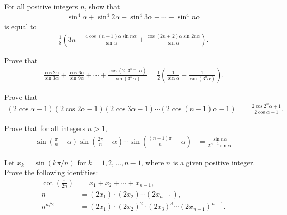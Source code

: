 \begin{question}
    For all positive integers $n$, show that
    \begin{align*}
        \sin^4 \alpha + \sin^4 2\alpha + \sin^4 3\alpha + \cdots + \sin^4 n\alpha
    \end{align*}
    is equal to
    \begin{align*}
        \frac{1}{8}\left(3n - \frac{4\cos(n+1)\alpha \sin n\alpha }{\sin \alpha} + \frac{\cos(2n+2)\alpha \sin 2n\alpha}{\sin \alpha}\right).
    \end{align*}
\end{question}

\begin{question}
    Prove that
    \begin{align*}
        \frac{\cos 2\alpha}{\sin 3\alpha} + \frac{\cos 6\alpha}{\sin 9\alpha} + \cdots + \frac{\displaystyle\cos\left(2\cdot 3^{n-1}\alpha\right)}{\displaystyle\sin\left(3^n\alpha\right)} = \frac{1}{2}\left(\frac{1}{\sin \alpha} - \frac{1}{\sin(3^n\alpha)}\right).
    \end{align*}
\end{question}

\begin{question}
    Prove that
    \begin{align*}
        \left(2\cos \alpha - 1\right)\left(2\cos 2\alpha - 1\right)\left(2\cos 3\alpha - 1\right)\cdots \left(2\cos (n-1)\alpha - 1\right) &= \frac{2\cos 2^n\alpha+1}{2\cos \alpha + 1}.
    \end{align*}
\end{question}

\begin{question}
    Prove that for all integers $n>1$,
    \begin{align*}
        \sin\left(\frac{\pi}{n}-\alpha\right)\sin\left(\frac{2\pi}{n}-\alpha\right)\cdots \sin\left(\frac{(n-1)\pi}{n}-\alpha\right) &= \frac{\sin n\alpha}{2^{n-1}\sin\alpha}
    \end{align*}
\end{question}


\begin{question}
    Let $x_k = \sin(k\pi/n)$ for $k=1,2,\dots,n-1$, where $n$ is a given positive integer. Prove the following identities:
    \begin{align*}
        \cot\left(\frac{\pi}{2n}\right) &= x_1 + x_2 + \cdots + x_{n-1},\\
        n &= (2x_1)\cdot (2x_2) \cdots (2x_{n-1}),\\
        n^{n/2} &= (2x_1) \cdot (2x_2)^2 \cdot (2x_3)^3 \cdots (2x_{n-1})^{n-1}.
    \end{align*}
\end{question}




